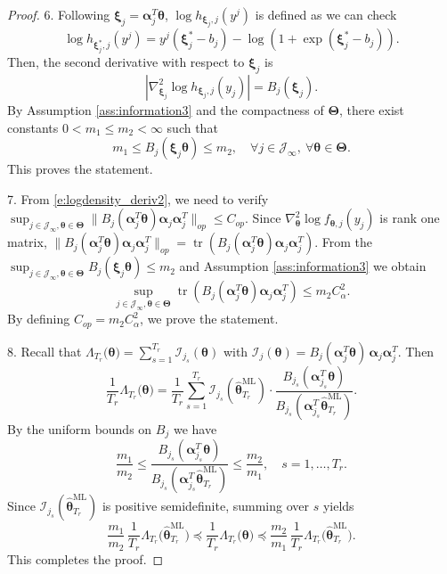\documentclass[10pt,a4paper]{amsart}
\newcommand{\bfTheta}{\boldsymbol{\Theta}}
\newcommand{\bfalpha}{\boldsymbol{\alpha}}
\newcommand{\bftheta}{\boldsymbol{\theta}}
\newcommand{\bfxi}{\boldsymbol{\xi}}
\begin{document}
\begin{proof}
6. Following $\bfxi_j = \bfalpha_j^T \bftheta$, $\log h_{\bfxi_j, j}(y^j)$ is defined as we can check 
\begin{equation} \label{e:density_reparam}
\log h_{\bfxi_j^{\ast}, j}(y^j) = y^j (\bfxi_j^{\ast} - b_j) - \log( 1 + \exp( \bfxi_j^{\ast} - b_j)).
\end{equation}
Then, the second derivative with respect to $\bfxi_j$ is 
\begin{equation*}
| \nabla_{\bfxi_j}^2 \log h_{\bfxi_j, j}(y_j)| = B_{j}(\bfxi_j).
\end{equation*}
By Assumption \ref{ass:information3} and the compactness of $\bfTheta$, there exist
constants $0 < m_1 \le m_2 < \infty$ such that
\begin{equation*}
m_1 \le B_j(\bfxi_j \bftheta) \le m_2,
\quad
\forall j\in\mathcal J_\infty,\ \forall \bftheta\in\bfTheta.
\end{equation*}
This proves the statement.

7. From \eqref{e:logdensity_deriv2}, we need to verify $\sup_{j \in \mathcal{J}_{\infty}, \bftheta \in \bfTheta} \| B_j(\bfalpha_j^T \bftheta) \bfalpha_j \bfalpha_j^T \|_{op} \leq C_{op}$. Since $\nabla_{\bftheta}^2 \log f_{\bftheta, j}(y_j)$ is rank one matrix, $\| B_j(\bfalpha_j^T \bftheta) \bfalpha_j \bfalpha_j^T \|_{op} = \operatorname{tr}(B_j(\bfalpha_j^T \bftheta) \bfalpha_j \bfalpha_j^T)$. From the $\sup_{j \in \mathcal{J}_{\infty}, \bftheta \in \bfTheta} B_j( \bfxi_j \bftheta)\le m_2$ and Assumption \ref{ass:information3} we obtain
\begin{equation*}
\sup_{j \in \mathcal{J}_{\infty}, \bftheta \in \bfTheta} \operatorname{tr}(B_j(\bfalpha_j^T \bftheta) \bfalpha_j \bfalpha_j^T) \le m_2 C_{\alpha}^2.
\end{equation*}
By defining $C_{op} = m_2 C_{\alpha}^2$, we prove the statement.


8. Recall that
$\Lambda_{T_r}\bigl(\bftheta\bigr)
 = \sum_{s=1}^{T_r}\mathcal I_{j_s}(\bftheta)$
with
$\mathcal I_j(\bftheta) = B_j(\bfalpha_j^T \bftheta)\,
\bfalpha_j\bfalpha_j^T$.
Then
\begin{equation*}
\frac{1}{T_r}\Lambda_{T_r}\bigl(\bftheta \bigr)
= \frac{1}{T_r}\sum_{s=1}^{T_r}
\mathcal I_{j_s}(\hat{\bftheta}^{\mathrm{ML}}_{T_r})
\cdot
\frac{B_{j_s}(\bfalpha_{j_s}^T \bftheta)}{B_{j_s}(\bfalpha_{j_s}^T \hat{\bftheta}^{\mathrm{ML}}_{T_r})}.
\end{equation*}
By the uniform bounds on $B_j$ we have
\begin{equation*}
\frac{m_1}{m_2}
\le
\frac{B_{j_s}(\bfalpha_{j_s}^T \bftheta)}
{B_{j_s}(\bfalpha_{j_s}^T \hat{\bftheta}^{\mathrm{ML}}_{T_r})}
\le
\frac{m_2}{m_1},
\quad s=1,\dots,T_r.
\end{equation*}
Since $\mathcal I_{j_s}(\hat{\bftheta}^{\mathrm{ML}}_{T_r})$ is positive semidefinite,
summing over $s$ yields
\begin{equation*}
\frac{m_1}{m_2}\,\frac{1}{T_r}\Lambda_{T_r}\bigl(\hat{\bftheta}^{\mathrm{ML}}_{T_r}\bigr)
\preceq
\frac{1}{T_r}\Lambda_{T_r}\bigl(\bftheta\bigr)
\preceq
\frac{m_2}{m_1}\,\frac{1}{T_r}\Lambda_{T_r}\bigl( \hat{\bftheta}^{\mathrm{ML}}_{T_r} \bigr).
\end{equation*}
This completes the proof.
\end{proof}
\end{document}
